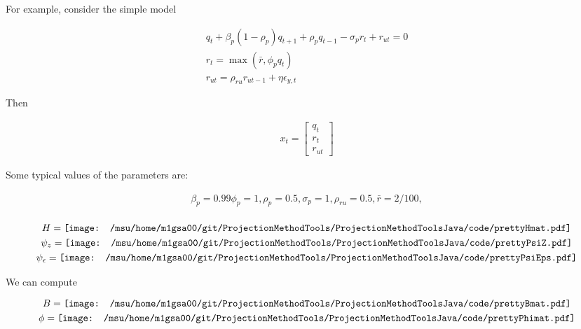 \documentclass[12pt]{article}
\begin{document}
For example, consider the simple model


\begin{gather*}
q_{t} +\beta_p(1 - \rho_p)q_{t + 1} + \rho_pq_{t - 1} - \sigma_pr_{t} +
     r_{ut}=0\\
 r_{t} = \max (\bar{r}, \phi_pq_{t}) \\
 r_{ut} = \rho_{ru} r_{ut - 1} + \eta \epsilon_{y,t}
\end{gather*}

Then 

\begin{gather*}
  x_t=
  \begin{bmatrix}
    q_t\\r_{t}\\r_{ut}
  \end{bmatrix}
\end{gather*}

Some typical values of the parameters are:

\begin{gather*}
  \beta_p = 0.99 \phi_p = 1, 
\rho_p = 0.5, \sigma_p = 1, \rho_{ru} = 0.5,
  \bar{r} = 2/100, \\
\end{gather*}



\begin{gather*}
  H= \vcenter{\hbox{\texttt{[image: /msu/home/m1gsa00/git/ProjectionMethodTools/ProjectionMethodToolsJava/code/prettyHmat.pdf]}}}\\
\psi_z=   \vcenter{\hbox{\texttt{[image: /msu/home/m1gsa00/git/ProjectionMethodTools/ProjectionMethodToolsJava/code/prettyPsiZ.pdf]}}}\\
\psi_\epsilon=   \vcenter{\hbox{\texttt{[image: /msu/home/m1gsa00/git/ProjectionMethodTools/ProjectionMethodToolsJava/code/prettyPsiEps.pdf]}}}\\
\end{gather*}




We can compute 

 \begin{gather*}
B=   \vcenter{\hbox{\texttt{[image: /msu/home/m1gsa00/git/ProjectionMethodTools/ProjectionMethodToolsJava/code/prettyBmat.pdf]}}}\\
\phi=   \vcenter{\hbox{\texttt{[image: /msu/home/m1gsa00/git/ProjectionMethodTools/ProjectionMethodToolsJava/code/prettyPhimat.pdf]}}}
 \end{gather*}
\end{document}

